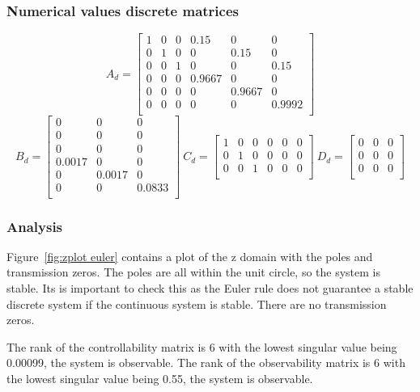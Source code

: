 \subsubsection{Numerical values discrete matrices}
$$
A_d=
\begin{bmatrix}
	1 & 0 & 0 & 0.15 & 0 & 0 \\
	0 & 1 & 0 & 0 & 0.15 & 0 \\
	0 & 0 & 1 & 0 & 0 & 0.15 \\
	0 & 0 & 0 & 0.9667 & 0 & 0 \\
	0 & 0 & 0 & 0& 0.9667 & 0  \\
	0 & 0 & 0 & 0 & 0 & 0.9992 \\
\end{bmatrix}
$$
$$
B_d=
\begin{bmatrix}
0 & 0 & 0 \\
0 & 0 & 0 \\
0 & 0 & 0 \\
0.0017 & 0 & 0 \\
0 & 0.0017 & 0 \\
0 & 0 & 0.0833 \\
\end{bmatrix}
\ 
C_d=
\begin{bmatrix}
1 & 0 & 0 & 0 & 0 & 0 \\
0 & 1 & 0 & 0 & 0 & 0 \\
0 & 0 & 1 & 0 & 0 & 0 \\
\end{bmatrix}
\ 
D_d=
\begin{bmatrix}
0 & 0 & 0 \\
0 & 0 & 0 \\
0 & 0 & 0 \\
\end{bmatrix}
$$

\subsubsection{Analysis}
Figure~\ref{fig:zplot euler} contains a plot of the z domain with the poles and transmission zeros. The poles are all within the unit circle, so the system is stable. Its is important to check this as the Euler rule does not guarantee a stable discrete system if the continuous system is stable. There are no transmission zeros.

The rank of the controllability matrix is 6 with the lowest singular value being 0.00099, the system is observable. The rank of the observability matrix is 6 with the lowest singular value being 0.55, the system is observable.

